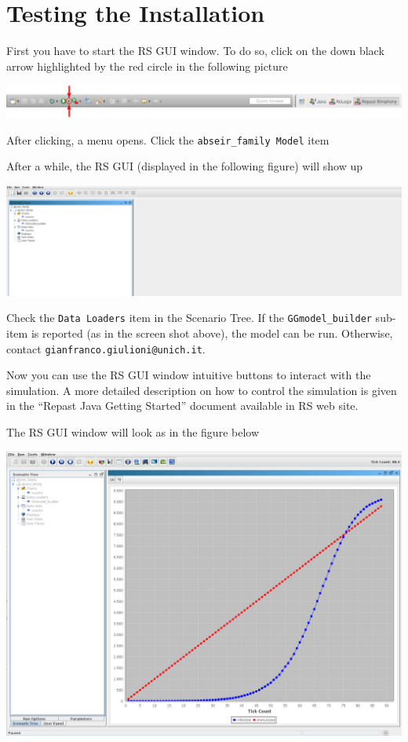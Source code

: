 \documentclass{article}
\begin{document}
\section{Testing the Installation}


First you have to start the RS GUI window. To do so, click on the down black arrow highlighted by the red circle in the following picture

\noindent
\includegraphics[scale=0.195]{fig_gabriele_rs_execution1a}

After clicking, a menu opens. Click the \verb+abseir_family Model+ item

After a while, the RS GUI (displayed in the following figure) will show up

\noindent
\includegraphics[scale=0.2]{fig_abseir_family_rs_gui0}

Check the \verb+Data Loaders+ item in the Scenario Tree. If the \verb+GGmodel_builder+ sub-item is reported (as in the screen shot above), the model can be run. Otherwise, contact \verb+gianfranco.giulioni@unich.it+. 

Now you can use the RS GUI window intuitive buttons to interact with the simulation. A more detailed description on how to control the simulation is given in the ``Repast Java Getting Started'' document available in RS web site.

The RS GUI window will look as in the figure below 

\noindent
\includegraphics[scale=0.2]{fig_abseir_family_rs_gui1}
\end{document}
